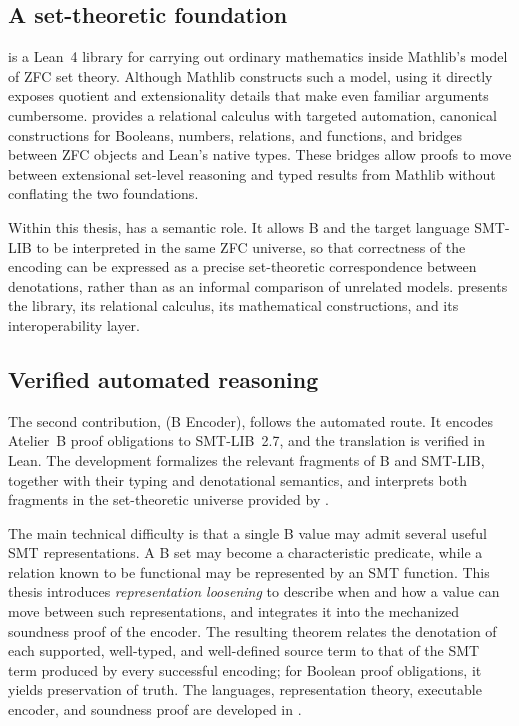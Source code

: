 \subsection{A set-theoretic foundation}
\label{subsec:intro-contrib-zflean}

\zflean is a Lean~4 library for carrying out ordinary
mathematics inside Mathlib's model of ZFC set theory. Although Mathlib constructs
such a model, using it directly exposes quotient and extensionality details that
make even familiar arguments cumbersome. \zflean provides a relational calculus
with targeted automation, canonical constructions for Booleans, numbers,
relations, and functions, and bridges between ZFC objects and Lean's native
types. These bridges allow proofs to move between extensional set-level
reasoning and typed results from Mathlib without conflating the two foundations.

Within this thesis, \zflean has a semantic role. It allows B and the target language SMT-LIB
to be interpreted in the same ZFC universe, so that correctness of the encoding
can be expressed as a precise set-theoretic correspondence between denotations,
rather than as an informal comparison of unrelated models. 
presents the library, its relational calculus, its mathematical constructions,
and its interoperability layer.

\begin{quote}\small
\end{quote}

\subsection{Verified automated reasoning}
\label{subsec:intro-contrib-beer}

The second contribution, \beer (B Encoder), follows the automated route. It
encodes Atelier~B proof obligations to SMT-LIB~2.7, and the translation is
verified in Lean. The development formalizes the relevant fragments of B
and SMT-LIB, together with their typing and denotational semantics, and
interprets both fragments in the set-theoretic universe provided by \zflean.

The main technical difficulty is that a single B value may admit several useful
SMT representations. A B set may become a characteristic predicate, while a
relation known to be functional may be represented by an SMT function. This
thesis introduces \emph{representation loosening} to describe when and how a
value can move between such representations, and integrates it into the
mechanized soundness proof of the encoder. The resulting theorem relates the
denotation of each supported, well-typed, and well-defined source term to that of
the SMT term produced by every successful encoding; for Boolean proof
obligations, it yields preservation of truth. The languages, representation
theory, executable encoder, and soundness proof are developed in
.

